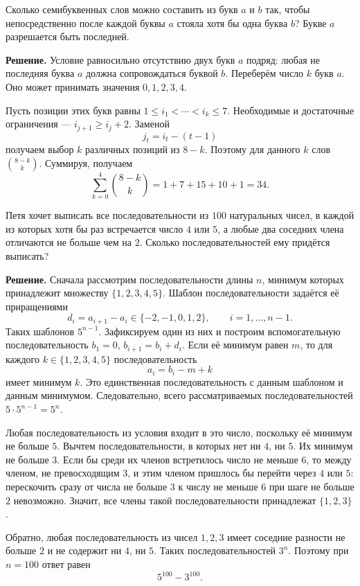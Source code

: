 \begin{problems}
\item Сколько семибуквенных слов можно составить из букв $a$ и $b$ так, чтобы непосредственно после каждой буквы $a$ стояла хотя бы одна буква $b$? Букве $a$ разрешается быть последней.
\par\smallskip\noindent\textbf{Решение.} Условие равносильно отсутствию двух букв $a$ подряд: любая не последняя буква $a$ должна сопровождаться буквой $b$. Переберём число $k$ букв $a$. Оно может принимать значения $0,1,2,3,4$.
\par Пусть позиции этих букв равны $1\le i_1<\cdots<i_k\le7$. Необходимые и достаточные ограничения --- $i_{j+1}\ge i_j+2$. Заменой
\[
j_t=i_t-(t-1)
\]
получаем выбор $k$ различных позиций из $8-k$. Поэтому для данного $k$ слов $\binom{8-k}{k}$. Суммируя, получаем
\[
\sum_{k=0}^{4}\binom{8-k}{k}=1+7+15+10+1=34.
\]\par

\item Петя хочет выписать все последовательности из $100$ натуральных чисел, в каждой из которых хотя бы раз встречается число $4$ или $5$, а любые два соседних члена отличаются не больше чем на $2$. Сколько последовательностей ему придётся выписать?
\par\smallskip\noindent\textbf{Решение.} Сначала рассмотрим последовательности длины $n$, минимум которых принадлежит множеству $\{1,2,3,4,5\}$. Шаблон последовательности задаётся её приращениями
\[
d_i=a_{i+1}-a_i\in\{-2,-1,0,1,2\},\qquad i=1,\ldots,n-1.
\]
Таких шаблонов $5^{n-1}$. Зафиксируем один из них и построим вспомогательную последовательность $b_1=0$, $b_{i+1}=b_i+d_i$. Если её минимум равен $m$, то для каждого $k\in\{1,2,3,4,5\}$ последовательность
\[
a_i=b_i-m+k
\]
имеет минимум $k$. Это единственная последовательность с данным шаблоном и данным минимумом. Следовательно, всего рассматриваемых последовательностей $5\cdot5^{n-1}=5^n$.
\par Любая последовательность из условия входит в это число, поскольку её минимум не больше $5$. Вычтем последовательности, в которых нет ни $4$, ни $5$. Их минимум не больше $3$. Если бы среди их членов встретилось число не меньше $6$, то между членом, не превосходящим $3$, и этим членом пришлось бы перейти через $4$ или $5$: перескочить сразу от числа не больше $3$ к числу не меньше $6$ при шаге не больше $2$ невозможно. Значит, все члены такой последовательности принадлежат $\{1,2,3\}$.
\par Обратно, любая последовательность из чисел $1,2,3$ имеет соседние разности не больше $2$ и не содержит ни $4$, ни $5$. Таких последовательностей $3^n$. Поэтому при $n=100$ ответ равен
\[
5^{100}-3^{100}.
\]\par


\end{problems}
